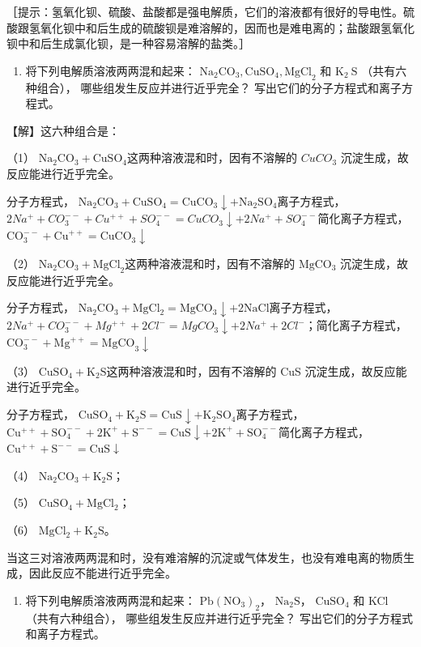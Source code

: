 ［提示：氢氧化钡、硫酸、盐酸都是强电解质，它们的溶液都有很好的导电性。硫酸跟氢氧化钡中和后生成的硫酸钡是难溶解的，因而也是难电离的；盐酸跟氢氧化钡中和后生成氯化钡，是一种容易溶解的盐类。］

\begin{enumerate}[start=9]
\item
  将下列电解质溶液两两混和起来：
  \(\mathrm{Na}_{2} \mathrm{CO}_{3}, \mathrm{CuSO}_{4}, \mathrm{MgCl}_{2}\)
  和 \(\mathrm{K}_{2} \mathrm{~S}\) （共有六种组合），
  哪些组发生反应并进行近乎完全？ 写出它们的分子方程式和离子方程式。
\end{enumerate}

【解】这六种组合是：

（1）
\(\mathrm{Na}_{2} \mathrm{CO}_{3} + \mathrm{CuSO}_{4}\)这两种溶液混和时，因有不溶解的
\(CuCO_{3}\) 沉淀生成，故反应能进行近乎完全。

分子方程式，
\(\mathrm{Na_2CO_3 + CuSO_4 = CuCO_3\downarrow + Na_2SO_4}\)离子方程式，
\(2Na^{+} + CO_{3}^{--} + Cu^{++} + SO_{4}^{--} = CuCO_{3}\downarrow + 2Na^{+} + SO_{4}^{--}\)简化离子方程式，
\(\mathrm{CO}_{3}^{--} + \mathrm{Cu}^{+ + } = \mathrm{CuCO}_{3}\downarrow\)

（2）
\(\mathrm{Na}_{2} \mathrm{CO}_{3} + \mathrm{MgCl}_{2}\)这两种溶液混和时，因有不溶解的
\(\mathrm{MgCO_3}\) 沉淀生成，故反应能进行近乎完全。

分子方程式，
\(\mathrm{Na_2CO_3 + MgCl_2 = MgCO_3\downarrow + 2NaCl}\)离子方程式，
\(2Na^{+} + CO_{3}^{--} + Mg^{++} + 2Cl^{-} = MgCO_{3}\downarrow + 2Na^{+} + 2Cl^{-}\)；简化离子方程式，
\(\mathrm{CO}_{3}^{--} + \mathrm{Mg}^{+ + } = \mathrm{MgCO}_{3}\downarrow\)

（3） \(\mathrm{CuSO_4 + K_2S}\)这两种溶液混和时，因有不溶解的 CuS
沉淀生成，故反应能进行近乎完全。

分子方程式，
\(\mathrm{CuSO_4 + K_2S = CuS\downarrow + K_2SO_4}\)离子方程式，
\(\mathrm{Cu^{++} + SO_4^{- - } + 2K^+ + S^{- - } = CuS\downarrow + 2K^+ + SO_4^{- - }}\)简化离子方程式，
\(\mathrm{Cu^{++} + S^{- - } = CuS\downarrow}\)

（4） \(\mathrm{Na_2CO_3 + K_2S}\)；

（5） \(\mathrm{CuSO_4 + MgCl_2}\)；

（6） \(\mathrm{MgCl_2 + K_2S}\)。

当这三对溶液两两混和时，没有难溶解的沉淀或气体发生，也没有难电离的物质生成，因此反应不能进行近乎完全。

\begin{enumerate}[start=10]
\item
  将下列电解质溶液两两混和起来： \(\mathrm{Pb(NO_3)_2}\)，
  \(\mathrm{Na_2S}\)， \(\mathrm{CuSO_4}\) 和 KCl （共有六种组合），
  哪些组发生反应并进行近乎完全？ 写出它们的分子方程式和离子方程式。
\end{enumerate}

